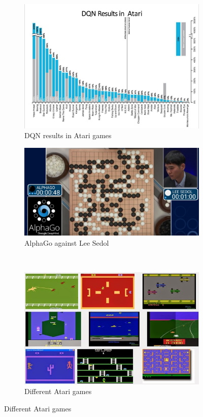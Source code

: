 \begin{figure}[ht]
  	\centering
  	\begin{subfigure}[b]{0.9\textwidth}
              \centering
	 		\includegraphics[height=0.35\textheight]{Chapter1/DQN-atari.png}	
	 		\caption{DQN results in Atari games}
     \end{subfigure}
     
	 \begin{subfigure}[b]{0.45\textwidth}
              \centering
	 		\includegraphics[height=0.2\textheight]{Chapter1/alphago.png}
	 		\caption{AlphaGo against Lee Sedol}
	 \end{subfigure}
	 ~~
      \begin{subfigure}[b]{0.45\textwidth}
              \centering
	  	    \includegraphics[height=0.2\textheight]{Chapter1/atari.jpg}
	  	    \caption{Different Atari games}
	 \end{subfigure}
	     

\end{figure}
